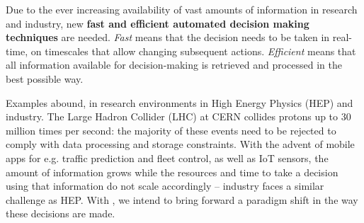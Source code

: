 



Due to the ever increasing availability of vast amounts of information in research and industry, new \textbf{fast and efficient automated decision making techniques} are needed.
\textit{Fast} means that the decision needs to be taken in real-time, on timescales that allow changing subsequent actions.
\textit{Efficient} means that all information available for decision-making is retrieved and processed in the best possible way.
\vskip2pt

 
Examples abound, in research environments in High Energy Physics (HEP) and industry. 
The Large Hadron Collider (LHC) at CERN collides protons up to 30 million times per second: the majority of these events need to be rejected to comply with data processing and storage constraints. 
With the advent of mobile apps for e.g. traffic prediction and fleet control, as well as IoT sensors, the amount of information grows while the resources and time to take a decision using that information do not scale accordingly -- industry faces a similar challenge as HEP. 
\vskip2pt
With \acronym, we intend to bring forward a paradigm shift in the way these decisions are made. 

